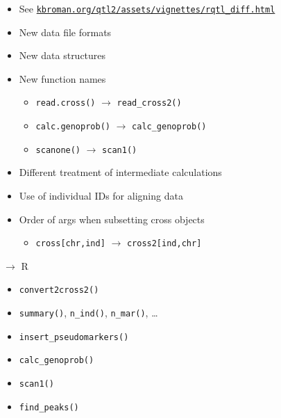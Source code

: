 \documentclass[12pt]{article}
\newcommand{\headsize}{\fontsize{35}{35} \selectfont}
\newcommand{\smallsize}{\fontsize{25}{30} \selectfont}
\newcommand{\smallersize}{\fontsize{20}{25} \selectfont}
\newcommand{\smallestsize}{\fontsize{18}{22} \selectfont}
\begin{document}
\vspace{1cm}

\color{mywhite} \smallsize

\hfill \begin{minipage}[t]{9.5in}
\begin{itemize}
\setlength{\rightskip}{0pt plus 1fil} %
\item See
  \href{http://kbroman.org/qtl2/assets/vignettes/rqtl_diff.html}{\smallestsize
    \tt kbroman.org/qtl2/assets/vignettes/rqtl\_diff.html}
\item New data file formats
\item New data structures
\item New function names
  \begin{itemize}
  \item[] {\color{myblue} \smallersize \verb|read.cross()| $\rightarrow$ \verb|read_cross2()|}
  \item[] {\color{myblue} \smallersize \verb|calc.genoprob()| $\rightarrow$ \verb|calc_genoprob()|}
  \item[] {\color{myblue} \smallersize \verb|scanone()| $\rightarrow$ \verb|scan1()|}
  \end{itemize}
\item Different treatment of intermediate calculations
\item Use of individual IDs for aligning data
\item Order of args when subsetting cross objects
  \begin{itemize}
  \item[] {\color{myblue} \smallersize \verb|cross[chr,ind]| $\rightarrow$ \verb|cross2[ind,chr]|}
  \end{itemize}
\end{itemize} \end{minipage}




\newpage

\headsize \color{myyellow}
$\boldsymbol{\rightarrow}$ R

\vspace{3cm}

\color{mywhite} \smallsize

\hfill \begin{minipage}[t]{9.5in}
\begin{itemize}
\itemsep24pt
\item \verb|convert2cross2()|
\item \verb|summary()|, \verb|n_ind()|, \verb|n_mar()|, \dots
\item \verb|insert_pseudomarkers()|
\item \verb|calc_genoprob()|
\item \verb|scan1()|
\item \verb|find_peaks()|
\end{itemize} \end{minipage}
\end{document}
